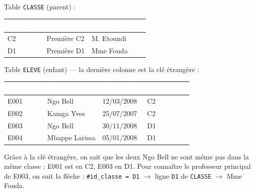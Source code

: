 \documentclass[11pt]{article}
\begin{document}
\begin{exemplebox}
Table \texttt{CLASSE} (parent) :

\begin{center}
\begin{tabularx}{\linewidth}{|l|X|X|}
\hline
\rowcolor{popgreen}\textcolor{white}{\textbf{id\_classe}} & \textcolor{white}{\textbf{libelle}} & \textcolor{white}{\textbf{prof\_principal}} \\
\hline
C2 & Première C2 & M. Etoundi \\
D1 & Première D1 & Mme Fouda \\
\hline
\end{tabularx}
\end{center}

Table \texttt{ELEVE} (enfant) — la dernière colonne est la clé étrangère :

\begin{center}
\begin{tabularx}{\linewidth}{|l|X|l|l|}
\hline
\rowcolor{popblue}\textcolor{white}{\textbf{matricule}} & \textcolor{white}{\textbf{nom}} & \textcolor{white}{\textbf{date\_naiss}} & \textcolor{white}{\textbf{\#id\_classe}} \\
\hline
E001 & Ngo Bell & 12/03/2008 & C2 \\
E002 & Kamga Yves & 25/07/2007 & C2 \\
E003 & Ngo Bell & 30/11/2008 & D1 \\
E004 & Mbappe Larissa & 05/01/2008 & D1 \\
\hline
\end{tabularx}
\end{center}

Grâce à la clé étrangère, on sait que les deux Ngo Bell ne sont même pas dans la même classe : E001 est en C2, E003 en D1. Pour connaître le professeur principal de E003, on suit la flèche : \texttt{\#id\_classe = D1} $\rightarrow$ ligne \texttt{D1} de \texttt{CLASSE} $\rightarrow$ Mme Fouda.
\end{exemplebox}
\end{document}
